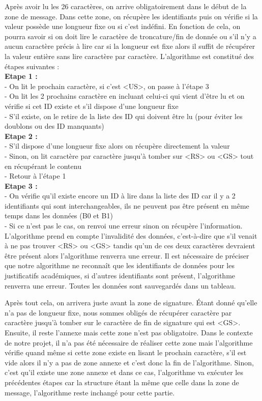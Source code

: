 Après avoir lu les 26 caractères, on arrive obligatoirement dans le début de la zone de message. Dans cette zone, on récupère les identifiants puis on vérifie si la valeur possède une longueur fixe ou si c'est indéfini. En fonction de cela, on pourra savoir si on doit lire le caractère de troncature/fin de donnée ou s'il n'y a aucun caractère précis à lire car si la longueur est fixe alors il suffit de récupérer la valeur entière sans lire caractère par caractère. L'algorithme est constitué des étapes suivantes : \\
\newline
\textbf{Etape 1 :} \\
- On lit le prochain caractère, si c'est <US>, on passe à l'étape 3 \\
- On lit les 2 prochains caractère en incluant celui-ci qui vient d'être lu et on vérifie si cet ID existe et s'il dispose d'une longueur fixe \\
- S'il existe, on le retire de la liste des ID qui doivent être lu (pour éviter les doublons ou des ID manquants) \\
\textbf{Etape 2 :} \\
- S'il dispose d'une longueur fixe alors on récupère directement la valeur \\
- Sinon, on lit caractère par caractère jusqu'à tomber sur <RS> ou <GS> tout en récupérant le contenu \\
- Retour à l'étape 1 \\
\textbf{Etape 3 :} \\
- On vérifie qu'il existe encore un ID à lire dans la liste des ID car il y a 2 identifiants qui sont interchangeables, ils ne peuvent pas être présent en même temps dans les données (B0 et B1) \\
- Si ce n'est pas le cas, on renvoi une erreur sinon on récupère l'information. \\

L'algorithme prend en compte l'invalidité des données, c'est-à-dire que s'il venait à ne pas trouver <RS> ou <GS> tandis qu'un de ces deux caractères devraient être présent alors l'algorithme renverra une erreur. Il est nécessaire de préciser que notre algorithme ne reconnaît que les identifiants de données pour les justificatifs académiques, si d'autres identifiants sont présent, l'algorithme renverra une erreur. Toutes les données sont sauvegardés dans un tableau.

Après tout cela, on arrivera juste avant la zone de signature. Étant donné qu'elle n'a pas de longueur fixe, nous sommes obligés de récupérer caractère par caractère jusqu'à tomber sur le caractère de fin de signature qui est <GS>. Ensuite, il reste l'annexe mais cette zone n'est pas obligatoire. Dans le contexte de notre projet, il n'a pas été nécessaire de réaliser cette zone mais l'algorithme vérifie quand même si cette zone existe en lisant le prochain caractère, s'il est vide alors il n'y a pas de zone annexe et c'est donc la fin de l'algorithme. Sinon, c'est qu'il existe une zone annexe et dans ce cas, l'algorithme va exécuter les précédentes étapes car la structure étant la même que celle dans la zone de message, l'algorithme reste inchangé pour cette partie.

